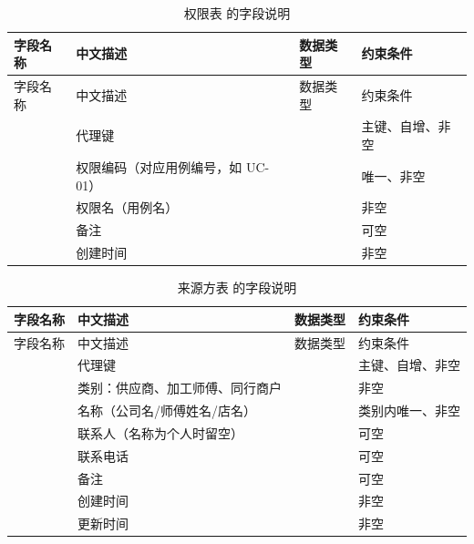 \begin{longtable}{@{}L{3.5cm} L{4.1cm} L{2.9cm} L{4.0cm}@{}}
\caption{权限表  的字段说明}\label{tab:f-t-permission}\\
\toprule
字段名称 & 中文描述 & 数据类型 & 约束条件 \\
\midrule
\endfirsthead
\toprule
字段名称 & 中文描述 & 数据类型 & 约束条件 \\
\midrule
\endhead
\bottomrule
\endlastfoot
{} & 代理键 &  & 主键、自增、非空 \\
 & 权限编码（对应用例编号，如 UC-01） &  & 唯一、非空 \\
 & 权限名（用例名） &  & 非空 \\
 & 备注 &  & 可空 \\
 & 创建时间 &  & 非空 \\
\end{longtable}

\begin{longtable}{@{}L{3.5cm} L{4.1cm} L{2.9cm} L{4.0cm}@{}}
\caption{来源方表  的字段说明}\label{tab:f-t-source-party}\\
\toprule
字段名称 & 中文描述 & 数据类型 & 约束条件 \\
\midrule
\endfirsthead
\toprule
字段名称 & 中文描述 & 数据类型 & 约束条件 \\
\midrule
\endhead
\bottomrule
\endlastfoot
{} & 代理键 &  & 主键、自增、非空 \\
 & 类别：供应商、加工师傅、同行商户 &  & 非空 \\
 & 名称（公司名/师傅姓名/店名） &  & 类别内唯一、非空 \\
 & 联系人（名称为个人时留空） &  & 可空 \\
 & 联系电话 &  & 可空 \\
 & 备注 &  & 可空 \\
 & 创建时间 &  & 非空 \\
 & 更新时间 &  & 非空 \\
\end{longtable}

